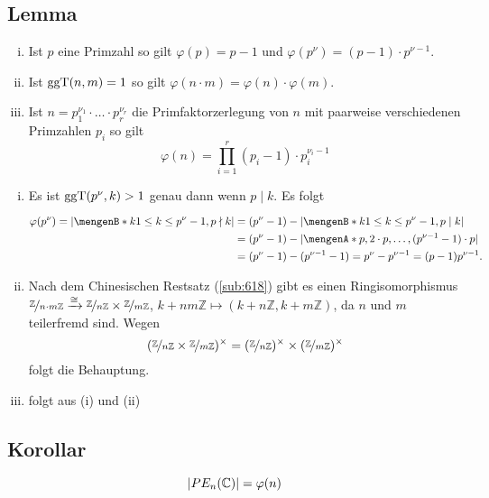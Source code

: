 \subsection[Lemma über die Funktionswerte von $\varphi$]{Lemma} %
\label{sub:196}
\begin{enumerate}[(i)]
	\item Ist $p$ eine Primzahl so gilt $\varphi(p)= p-1$ und $\varphi(p^\nu) =(p-1) \cdot p^{\nu -1}$.
	\item Ist $\ggT(n,m)=1$ so gilt $\varphi(n \cdot m)= \varphi(n) \cdot \varphi(m)$.
	\item Ist $n= p_1^{\nu_1} \cdot \ldots \cdot p_r^{\nu_r}$ die Primfaktorzerlegung von $n$ mit paarweise verschiedenen Primzahlen $p_i$ so gilt 
	\[
		\varphi(n) = \prod_{i=1}^r (p_i -1) \cdot p_i^{\nu_i-1}
	\]
\end{enumerate}
\begin{enumerate}[(i)]
	\item Es ist $\ggT(p^\nu,k)>1$ genau dann wenn $p \mid k$. Es folgt 
	\begin{align*}
		\varphi(p^\nu) = \abs{ \set[k]{1 \le k \le p^\nu -1, \rule{0cm}{0.4cm} p \nmid k} } &= (p^\nu -1) - \abs{ \set[k]{1 \le k \le p^\nu -1 , \rule{0cm}{0.4cm}p \mid k} }  \\
		&= (p^\nu -1) - \abs{\set{p, 2 \cdot p, \ldots , (p^{\nu -1} -1)\cdot p} } \\
		&= (p^\nu -1) -(p^{\nu -1} -1) = p^\nu - p^{\nu-1} = (p-1) p^{\nu -1}.
	\end{align*}
	\item Nach dem Chinesischen Restsatz (\ref{sub:618}) gibt es einen Ringisomorphismus 
	$\nicefrac{\mathds{Z}}{n \cdot m \mathds{Z}} \xrightarrow{\cong}  \nicefrac{\mathds{Z}}{n \mathds{Z}} \times \nicefrac{\mathds{Z}}{m \mathds{Z}}$,
	$k+ nm \mathds{Z} \mapsto (k+ n \mathds{Z}, k+ m \mathds{Z})$, da $n$ und $m$ teilerfremd
	sind. Wegen
	\[
		\enbrace{\nicefrac{\mathds{Z}}{n \mathds{Z}} \times \nicefrac{\mathds{Z}}{m \mathds{Z}}}^\times = \enbrace{\nicefrac{\mathds{Z}}{n \mathds{Z}}}^\times \times 
		\enbrace{\nicefrac{\mathds{Z}}{m \mathds{Z}}  }^\times
	\]
	folgt die Behauptung.
	\item folgt aus (i) und (ii) \bewende
\end{enumerate}

\subsection[Korollar: $\abs{PE_n(\mathds{C})} = \varphi(n)$]{Korollar} %
\label{sub:197}
\[
	\abs{PE_n(\mathds{C})} = \varphi(n) 
\]

